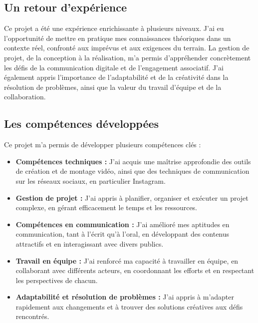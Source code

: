 
\subsection{Un retour d'expérience}\label{subsec:un-retour-d'experience}

Ce projet a été une expérience enrichissante à plusieurs niveaux.
J'ai eu l'opportunité de mettre en pratique mes connaissances théoriques dans un contexte réel, confronté aux imprévus et aux exigences du terrain.
La gestion de projet, de la conception à la réalisation, m'a permis d'appréhender concrètement les défis de la communication digitale et de l'engagement associatif.
J'ai également appris l'importance de l'adaptabilité et de la créativité dans la résolution de problèmes, ainsi que la valeur du travail d'équipe et de la collaboration.

\subsection{Les compétences développées}\label{subsec:les-competences-developpees}

Ce projet m'a permis de développer plusieurs compétences clés :
\begin{itemize}
    \item \textbf{Compétences techniques :} J'ai acquis une maîtrise approfondie des outils de création et de montage vidéo, ainsi que des techniques de communication sur les réseaux sociaux, en particulier Instagram.
    \item \textbf{Gestion de projet :} J'ai appris à planifier, organiser et exécuter un projet complexe, en gérant efficacement le temps et les ressources.
    \item \textbf{Compétences en communication :} J'ai amélioré mes aptitudes en communication, tant à l'écrit qu'à l'oral, en développant des contenus attractifs et en interagissant avec divers publics.
    \item \textbf{Travail en équipe :} J'ai renforcé ma capacité à travailler en équipe, en collaborant avec différents acteurs, en coordonnant les efforts et en respectant les perspectives de chacun.
    \item \textbf{Adaptabilité et résolution de problèmes :} J'ai appris à m'adapter rapidement aux changements et à trouver des solutions créatives aux défis rencontrés.
\end{itemize}


